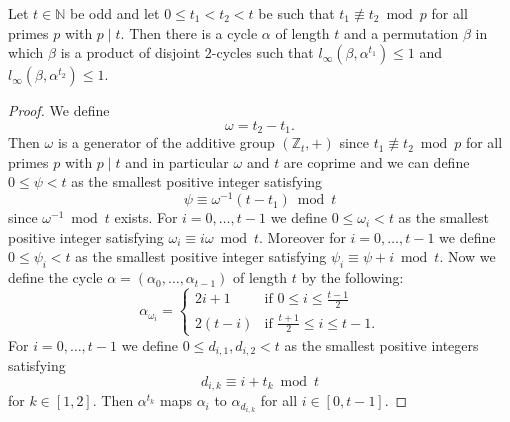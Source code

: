 \documentclass[10pt,a4paper]{amsart}
\begin{document}
\begin{theorem}\label{theoremlinftyl1l2}
Let $t \in \mathbb{N}$ be odd and let $0 \leq t_1 < t_2 < t$ be such that $t_1 \not \equiv t_2 \bmod p$ for all primes $p$ with $p \mid t$. Then there is a cycle $\alpha$ of length $t$ and a permutation $\beta$ in which $\beta$ is a product of disjoint $2$-cycles such that $l_\infty(\beta, \alpha^{t_1}) \leq 1$ and $l_\infty(\beta, \alpha^{t_2}) \leq 1$.
\end{theorem}

\begin{proof}
We define
\begin{displaymath}
\omega = t_2-t_1.
\end{displaymath}
Then $\omega$ is a generator of the additive group $(\mathbb{Z}_t,+)$ since $t_1 \not \equiv t_2 \bmod p$ for all primes $p$ with $p \mid t$ and in particular $\omega$ and $t$ are coprime and we can define $0 \leq \psi < t$ as the smallest positive integer satisfying
\begin{displaymath}
\psi \equiv \omega^{-1}(t-t_1) \bmod t
\end{displaymath}
since $\omega^{-1} \bmod t$ exists. For $i=0,\dots,t-1$ we define $0 \leq \omega_i < t$ as the smallest positive integer satisfying $\omega_i \equiv i\omega \bmod t$. Moreover for $i=0,\dots,t-1$ we define $0 \leq \psi_i < t$ as the smallest positive integer satisfying $\psi_i \equiv \psi + i \bmod t$. Now we define the cycle $\alpha = (\alpha_0,\dots,\alpha_{t-1})$ of length $t$ by the following:
\begin{displaymath}
\alpha_{\omega_i} = \begin{cases}
2i+1 & \text{if } 0 \leq i \leq \frac{t-1}{2}\\
2(t-i) & \text{if } \frac{t+1}{2} \leq i \leq t-1.
\end{cases}
\end{displaymath}
For $i=0,\dots,t-1$ we define $0 \leq d_{i,1},d_{i,2} < t$ as the smallest positive integers satisfying
\begin{displaymath}
d_{i,k} \equiv i + t_k \bmod t
\end{displaymath}
for $k \in [1,2]$. Then $\alpha^{t_k}$ maps $\alpha_i$ to $\alpha_{d_{i,k}}$ for all $i \in [0,t-1]$.


\end{proof}
\end{document}
